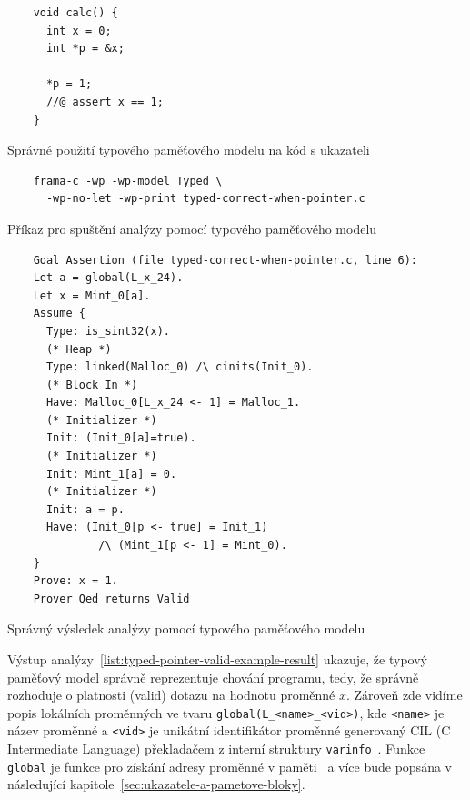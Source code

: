 \begin{listing}[H]
    \begin{verbatim}
    void calc() {
      int x = 0;
      int *p = &x;

      *p = 1;
      //@ assert x == 1;
    }
    \end{verbatim}
    \caption{Správné použití typového paměťového modelu na kód s ukazateli}
    \label{list:typed-pointer-valid-example}
\end{listing}

\begin{listing}[H]
    \begin{verbatim}
    frama-c -wp -wp-model Typed \
      -wp-no-let -wp-print typed-correct-when-pointer.c
    \end{verbatim}
    \caption{Příkaz pro spuštění analýzy pomocí typového paměťového modelu}
    \label{list:typed-pointer-valid-example-run}
\end{listing}

\begin{listing}[H]
    \begin{verbatim}
    Goal Assertion (file typed-correct-when-pointer.c, line 6):
    Let a = global(L_x_24).
    Let x = Mint_0[a].
    Assume {
      Type: is_sint32(x).
      (* Heap *)
      Type: linked(Malloc_0) /\ cinits(Init_0).
      (* Block In *)
      Have: Malloc_0[L_x_24 <- 1] = Malloc_1.
      (* Initializer *)
      Init: (Init_0[a]=true).
      (* Initializer *)
      Init: Mint_1[a] = 0.
      (* Initializer *)
      Init: a = p.
      Have: (Init_0[p <- true] = Init_1)
              /\ (Mint_1[p <- 1] = Mint_0).
    }
    Prove: x = 1.
    Prover Qed returns Valid
    \end{verbatim}
    \caption{Správný výsledek analýzy pomocí typového paměťového modelu}
    \label{list:typed-pointer-valid-example-result}
\end{listing}

Výstup analýzy~\ref{list:typed-pointer-valid-example-result} ukazuje,
že typový paměťový model správně reprezentuje chování programu,
tedy, že správně rozhoduje o platnosti (valid) dotazu na hodnotu proměnné $x$.
Zároveň zde vidíme popis lokálních proměnných ve tvaru \texttt{global(L\_<name>\_<vid>)},
kde \texttt{<name>} je název proměnné a \texttt{<vid>} je unikátní identifikátor proměnné
generovaný CIL (C Intermediate Language) překladačem z interní struktury \texttt{varinfo}~\cite{FCPluginDevSignoles2024}.
Funkce \texttt{global} je funkce pro získání adresy proměnné v paměti~\cite{BlanchardWP2024}
a více bude popsána v následující kapitole~\ref{sec:ukazatele-a-pametove-bloky}.

